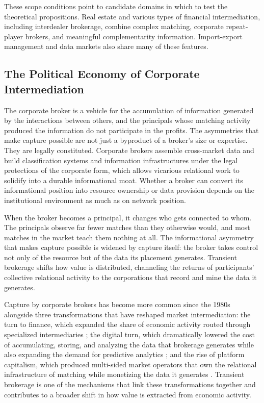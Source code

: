 \documentclass[
]{article}
\begin{document}
These scope conditions point to candidate domains in which to test the theoretical propositions. Real estate and various types of financial intermediation, including interdealer brokerage, combine complex matching, corporate repeat-player brokers, and meaningful complementarity information. Import-export management and data markets also share many of these features.

\subsection{The Political Economy of Corporate Intermediation}

The corporate broker is a vehicle for the accumulation of information generated by the interactions between others, and the principals whose matching activity produced the information do not participate in the profits. The asymmetries that make capture possible are not just a byproduct of a broker's size or expertise. They are legally constituted. Corporate brokers assemble cross-market data and build classification systems and information infrastructures under the legal protections of the corporate form, which allows vicarious relational work to solidify into a durable informational moat. Whether a broker can convert its informational position into resource ownership or data provision depends on the institutional environment as much as on network position.

When the broker becomes a principal, it changes who gets connected to whom. The principals observe far fewer matches than they otherwise would, and most matches in the market teach them nothing at all. The informational asymmetry that makes capture possible is widened by capture itself: the broker takes control not only of the resource but of the data its placement generates. Transient brokerage shifts how value is distributed, channeling the returns of participants' collective relational activity to the corporations that record and mine the data it generates.

Capture by corporate brokers has become more common since the 1980s alongside three transformations that have reshaped market intermediation: the turn to finance, which expanded the share of economic activity routed through specialized intermediaries \autocite{carruthersFinancializationInstitutionalFoundations2015,krippnerCapitalizingCrisisPolitical2011}; the digital turn, which dramatically lowered the cost of accumulating, storing, and analyzing the data that brokerage generates while also expanding the demand for predictive analytics \autocite{cohenTruthPowerLegal2019,gandyPanopticSortPolitical1993}; and the rise of platform capitalism, which produced multi-sided market operators that own the relational infrastructure of matching while monetizing the data it generates \autocite{sadowskiInternetLandlordsDigital2020,viljoenDesignChoicesMechanism2021}. Transient brokerage is one of the mechanisms that link these transformations together and contributes to a broader shift in how value is extracted from economic activity.
\end{document}

